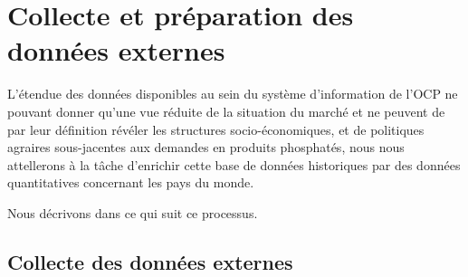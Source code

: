 	\section{Collecte et préparation des données externes}
	L'étendue des données disponibles au sein du système d'information de l'OCP ne pouvant donner qu'une vue réduite de la situation du marché et ne peuvent de par leur définition révéler les structures socio-économiques,  et de politiques agraires sous-jacentes aux demandes en produits phosphatés, nous nous attellerons à la tâche d'enrichir cette base de données historiques par des données quantitatives concernant les pays du monde.
	\par
	Nous décrivons dans ce qui suit ce processus. 
	\subsection{Collecte des données externes}
